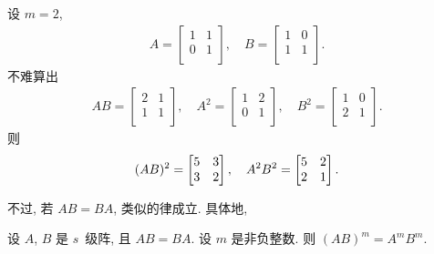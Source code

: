 \documentclass[../libro.tex]{subfiles}
\begin{document}
\begin{example}
    设 \(m = 2\),
    \begin{align*}
        A =
        \begin{bmatrix}
            1 & 1 \\ 0 & 1 \\
        \end{bmatrix},
        \quad
        B =
        \begin{bmatrix}
            1 & 0 \\ 1 & 1 \\
        \end{bmatrix}.
    \end{align*}
    不难算出
    \begin{align*}
        AB =
        \begin{bmatrix}
            2 & 1 \\ 1 & 1 \\
        \end{bmatrix},
        \quad
        A^2 =
        \begin{bmatrix}
            1 & 2 \\ 0 & 1 \\
        \end{bmatrix},
        \quad
        B^2 =
        \begin{bmatrix}
            1 & 0 \\ 2 & 1 \\
        \end{bmatrix}.
    \end{align*}
    则
    \begin{equation*}
        (AB)^2 =
        \begin{bmatrix}
            5 & 3 \\ 3 & 2 \\
        \end{bmatrix},
        \quad
        A^2 B^2 =
        \begin{bmatrix}
            5 & 2 \\ 2 & 1 \\
        \end{bmatrix}.
        \qedhere
    \end{equation*}
\end{example}

不过, 若 \(A B = B A\), 类似的律成立.
具体地,

\begin{theorem}
    设 \(A\), \(B\) 是 \(s\)~级阵, 且 \(A B = B A\).
    设 \(m\) 是非负整数.
    则 \((A B)^m = A^m B^m\).
\end{theorem}
\end{document}

